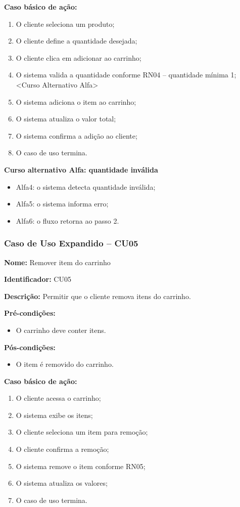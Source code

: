 \documentclass[12pt]{article}
\begin{document}
\textbf{Caso básico de ação:}
\begin{enumerate}
\item O cliente seleciona um produto;
\item O cliente define a quantidade desejada;
\item O cliente clica em adicionar ao carrinho;
\item O sistema valida a quantidade conforme RN04 -- quantidade mínima 1; <Curso Alternativo Alfa>
\item O sistema adiciona o item ao carrinho;
\item O sistema atualiza o valor total;
\item O sistema confirma a adição ao cliente;
\item O caso de uso termina.
\end{enumerate}

\textbf{Curso alternativo Alfa: quantidade inválida}

\begin{itemize}
\item Alfa4: o sistema detecta quantidade inválida;
\item Alfa5: o sistema informa erro;
\item Alfa6: o fluxo retorna ao passo 2.
\end{itemize}



\subsubsection{Caso de Uso Expandido -- CU05}

\textbf{Nome:} Remover item do carrinho

\textbf{Identificador:} CU05

\textbf{Descrição:} Permitir que o cliente remova itens do carrinho.

\textbf{Pré-condições:}
\begin{itemize}
\item O carrinho deve conter itens.
\end{itemize}

\textbf{Pós-condições:}
\begin{itemize}
\item O item é removido do carrinho.
\end{itemize}

\textbf{Caso básico de ação:}
\begin{enumerate}
\item O cliente acessa o carrinho;
\item O sistema exibe os itens;
\item O cliente seleciona um item para remoção;
\item O cliente confirma a remoção;
\item O sistema remove o item conforme RN05;
\item O sistema atualiza os valores;
\item O caso de uso termina.
\end{enumerate}
\end{document}

